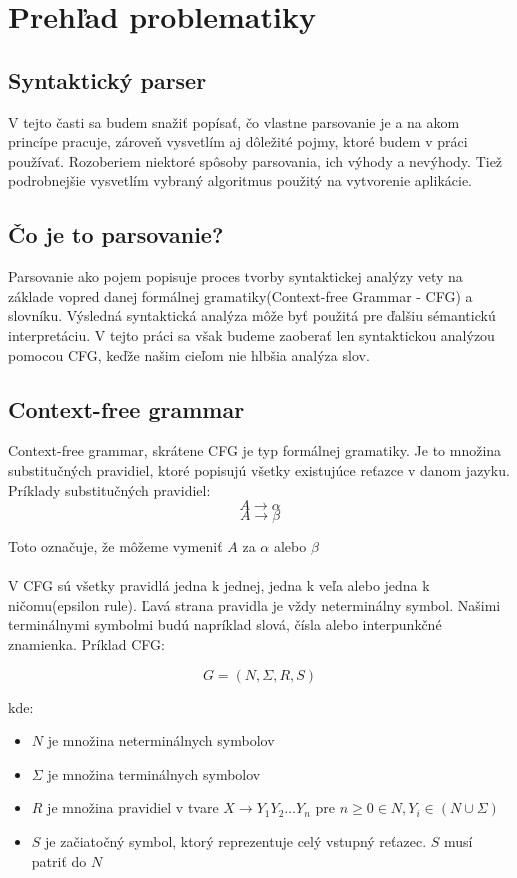 \documentclass[12pt,a4paper]{report}
\theoremstyle{definition}
\theoremstyle{remark}
\begin{document}
\section{Prehľad problematiky}
\subsection{Syntaktický parser}
V tejto časti sa budem snažiť popísať, čo vlastne parsovanie je a na akom princípe pracuje, zároveň vysvetlím aj dôležité pojmy, ktoré budem v práci používať. Rozoberiem niektoré spôsoby parsovania, ich výhody a nevýhody. Tiež podrobnejšie vysvetlím vybraný algoritmus použitý na vytvorenie aplikácie.

\subsection{Čo je to parsovanie?}
Parsovanie ako pojem popisuje proces tvorby syntaktickej analýzy vety na základe vopred danej formálnej gramatiky(Context-free Grammar - CFG) a slovníku. Výsledná  syntaktická analýza môže byť použitá pre ďalšiu sémantickú interpretáciu. V tejto práci sa však budeme zaoberať len syntaktickou analýzou pomocou CFG, keďže našim cieľom nie hlbšia analýza slov. \cite{Pulman}\cite{Girju}

\subsection{Context-free grammar}
Context-free grammar\cite{foja}, skrátene CFG je typ formálnej gramatiky. Je to množina substitučných pravidiel, ktoré popisujú všetky existujúce reťazce v danom jazyku. Príklady substitučných pravidiel:
$$ A \to \alpha $$
$$ A \to \beta $$

Toto označuje, že môžeme vymeniť $A$ za $\alpha$ alebo $\beta$ \\ \\
V CFG sú všetky pravidlá jedna k jednej, jedna k veľa alebo jedna k ničomu(epsilon rule). Ľavá strana pravidla je vždy neterminálny symbol. Našimi terminálnymi symbolmi budú napríklad slová, čísla alebo interpunkčné znamienka. Príklad CFG:

$$ G = (N, \Sigma , R, S) $$

kde:
\begin{itemize}
\item $N$ je množina neterminálnych symbolov
\item $\Sigma$ je množina terminálnych symbolov
\item $R$ je množina pravidiel v tvare $X \to Y_1 Y_2 \dots Y_n$ pre $ n \geq 0 \in N, Y_i \in ( N \cup \Sigma )$
\item $S$ je začiatočný symbol, ktorý reprezentuje celý vstupný reťazec. $S$ musí patriť do $N$
\end{itemize}
\end{document}
